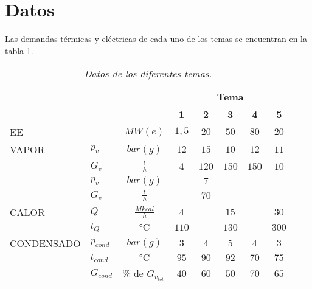\section{Datos}\label{sec:Datos}

Las demandas térmicas y eléctricas de cada uno de los temas se encuentran en la tabla \ref{tab:Datos}.
\begin{table}[ht]
\centering
\begin{tabular}[t]{llcccccc}
\toprule
&&&\multicolumn{5}{c}{\textbf{Tema}}\\
&&&\textbf{1} & \textbf{2} & \textbf{3} &  \textbf{4} & \textbf{5}\\
\midrule
EE&&$\SI{}{MW(e)}$&$1,5$&$20$&$50$&$80$&$20$\\
VAPOR&$p_v$&$\SI{}{bar(g)}$&$12$&$15$&$10$&$12$&$11$\\
&$G_v$&$\SI{}{\frac{t}{h}}$&$4$&$120$&$150$&$150$&$10$\\
&$p_v$&$\SI{}{bar(g)}$&&$7$&&&\\
&$G_v$&$\SI{}{\frac{t}{h}}$&&$70$&&&\\
CALOR&$Q$&$\SI{}{\frac{Mkcal}{h}}$&$4$&&$15$&&$30$\\
&$t_Q$&$\SI{}{\celsius}$&$110$&&$130$&&$300$\\
CONDENSADO&$p_{cond}$&$\SI{}{bar(g)}$&$3$&$4$&$5$&$4$&$3$\\
&$t_{cond}$&$\SI{}{\celsius}$&$95$&$90$&$92$&$70$&$75$\\
&$G_{cond}$&\% de $G_{v_{tot}}$&$40$&$60$&$50$&$70$&$65$\\
\bottomrule
\end{tabular}
\caption{\textit{Datos de los diferentes temas. }}
\label{tab:Datos}
\end{table}

